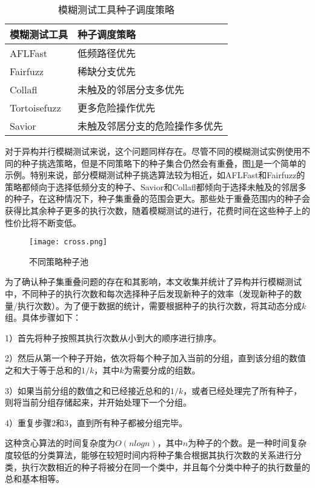 \documentclass[master]{thesis-uestc}
\begin{document}
\begin{table}[!htbp]
    \caption{模糊测试工具种子调度策略}
    \begin{tabular}{ll}
    \toprule
    模糊测试工具 & 种子调度策略 \\
    \midrule
    AFLFast & 低频路径优先 \\
    Fairfuzz & 稀缺分支优先 \\
    Collafl &  未触及的邻居分支多优先 \\
    Tortoisefuzz & 更多危险操作优先 \\
    Savior & 未触及邻居分支的危险操作多优先 \\
    \bottomrule
    \end{tabular}
    \label{table_seeds}
    \vspace{6pt}
\end{table}

对于异构并行模糊测试来说，这个问题同样存在。尽管不同的模糊测试实例使用不同的种子挑选策略，但是不同策略下的种子集合仍然会有重叠，图\ref{celue}是一个简单的示例。特别来说，部分模糊测试种子挑选算法较为相近，如AFLFast和Fairfuzz的策略都倾向于选择低频分支的种子、Savior和Collafl都倾向于选择未触及的邻居多的种子，在这种情况下，种子集重叠的范围会更大。那些处于重叠范围内的种子会获得比其余种子更多的执行次数，随着模糊测试的进行，花费时间在这些种子上的性价比将不断变低。

\begin{figure}[!htbp]
    \vspace{6pt}
    \centering
    \texttt{[image: cross.png]}
    \caption{不同策略种子池}
    \label{celue}
\end{figure}


为了确认种子集重叠问题的存在和其影响，本文收集并统计了异构并行模糊测试中，不同种子的执行次数和每次选择种子后发现新种子的效率（发现新种子的数量/执行次数）。为了便于数据的统计，需要根据种子的执行次数，将其动态分成$k$组。具体步骤如下：

1）首先将种子按照其执行次数从小到大的顺序进行排序。

2）然后从第一个种子开始，依次将每个种子加入当前的分组，直到该分组的数值之和大于等于总和的$1/k$，其中$k$为需要分成的组数。

3）如果当前分组的数值之和已经接近总和的$1/k$，或者已经处理完了所有种子，则将当前分组存储起来，并开始处理下一个分组。

4）重复步骤2和3，直到所有种子都被分组完毕。

这种贪心算法的时间复杂度为$O(nlogn)$，其中$n$为种子的个数。是一种时间复杂度较低的分类算法，能够在较短时间内将种子集合根据其执行次数的关系进行分类，执行次数相近的种子将被分在同一个类中，并且每个分类中种子的执行数量的总和基本相等。
\end{document}
